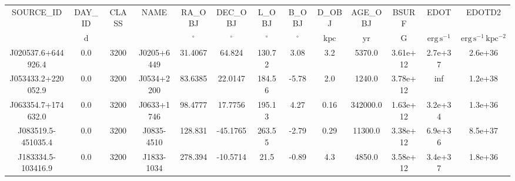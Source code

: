 \begin{table}
\begin{tabular}{ccccccccccccc}
SOURCE_ID & DAY_ID & CLASS & NAME & RA_OBJ & DEC_OBJ & L_OBJ & B_OBJ & D_OBJ & AGE_OBJ & BSURF & EDOT & EDOTD2 \\
 & $\mathrm{d}$ &  &  & $\mathrm{{}^{\circ}}$ & $\mathrm{{}^{\circ}}$ & $\mathrm{{}^{\circ}}$ & $\mathrm{{}^{\circ}}$ & $\mathrm{kpc}$ & $\mathrm{yr}$ & $\mathrm{G}$ & $\mathrm{erg\,s^{-1}}$ & $\mathrm{erg\,s^{-1}\,kpc^{-2}}$ \\
J020537.6+644926.4 & 0.0 & 3200 & J0205+6449 & 31.4067 & 64.824 & 130.72 & 3.08 & 3.2 & 5370.0 & 3.61e+12 & 2.7e+37 & 2.6e+36 \\
J053433.2+220052.9 & 0.0 & 3200 & J0534+2200 & 83.6385 & 22.0147 & 184.56 & -5.78 & 2.0 & 1240.0 & 3.78e+12 & inf & 1.2e+38 \\
J063354.7+174632.0 & 0.0 & 3200 & J0633+1746 & 98.4777 & 17.7756 & 195.13 & 4.27 & 0.16 & 342000.0 & 1.63e+12 & 3.2e+34 & 1.3e+36 \\
J083519.5-451035.4 & 0.0 & 3200 & J0835-4510 & 128.831 & -45.1765 & 263.55 & -2.79 & 0.29 & 11300.0 & 3.38e+12 & 6.9e+36 & 8.5e+37 \\
J183334.5-103416.9 & 0.0 & 3200 & J1833-1034 & 278.394 & -10.5714 & 21.5 & -0.89 & 4.3 & 4850.0 & 3.58e+12 & 3.4e+37 & 1.8e+36 \\
\end{tabular}
\end{table}
